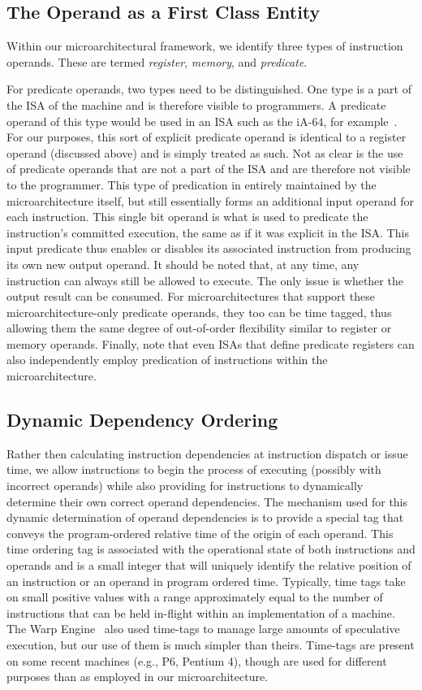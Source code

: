 \documentclass{book}
\begin{document}
\subsection{The Operand as a First Class Entity}
%
Within our microarchitectural framework, we identify
three types of instruction operands.
These are termed \textit{register}, \textit{memory}, and \textit{predicate}.

For predicate operands, two types need to be distinguished.
One type is a part of the ISA of the machine and
is therefore visible to programmers.
A predicate operand of this type would be
used in an ISA such as the iA-64, for example~\cite{iA64}.
For our purposes, this sort of explicit predicate operand
is identical to a register operand (discussed above) and
is simply treated as such.
Not as clear is the use of predicate operands
that are not a part of the ISA and are therefore not visible
to the programmer.
This type of predication in entirely maintained by the microarchitecture
itself, but still essentially forms an additional input operand
for each instruction.
This single bit operand is what is used to
predicate the instruction's committed execution, the same as
if it was explicit in the ISA.
This input predicate thus enables or disables its associated
instruction from producing its own new output operand.
It should be noted that, at any time, any instruction can
always still be allowed to execute.  The only issue is
whether the output result can be consumed.
For microarchitectures that support these microarchitecture-only
predicate operands, they too can be time tagged, thus allowing
them the same degree of out-of-order flexibility similar
to register or memory operands.
Finally, note that even ISAs that define predicate registers
can also independently employ predication of instructions within the
microarchitecture.
%
%
\subsection{Dynamic Dependency Ordering}
%
Rather then calculating instruction dependencies at instruction
dispatch or issue time, we allow instructions to begin
the process of executing (possibly with incorrect operands)
while also providing for instructions to
dynamically determine their own correct
operand dependencies.
The mechanism used for this dynamic determination of
operand dependencies is to provide a special tag that
conveys the program-ordered relative time of the origin of
each operand.
This time ordering tag is associated
with the operational state of both instructions 
and operands and is a small integer that will
uniquely identify the relative position of an instruction
or an operand in program ordered time.
Typically, time tags take on small positive values with
a range approximately equal to the 
number of instructions that can be held in-flight within an
implementation of a machine.  
The Warp Engine~\cite{Cle95}
also used time-tags to manage large amounts of speculative execution,
but our use of them is much simpler than theirs.
Time-tags are present on some recent machines (e.g., P6, Pentium 4),
though are used for different purposes than as 
employed in our microarchitecture.   
\end{document}
